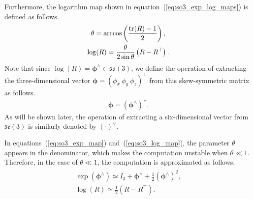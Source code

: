 Furthermore, the logarithm map shown in equation~(\ref{eq:so3_exp_log_maps}) is defined as follows.
%
\begin{align}
  \begin{gathered}
    \theta = \arccos \left( \frac{{\rm tr}(R) - 1}{ 2 } \right), \\
    \log( R ) = \frac{ \theta }{ 2 \sin \theta } \left( R - R^{\top} \right).
  \end{gathered}
  \label{eq:so3_log_map}
\end{align}
%
Note that since $\log(R) = \boldsymbol{\phi}^{\wedge} \in \mathfrak{so}(3)$, we define the operation of extracting the three-dimensional vector $\boldsymbol{\phi} = \left( \phi_{x} ~ \phi_{y} ~ \phi_{z} \right)^{\top}$ from this skew-symmetric matrix as follows.
%
\begin{align}
  \boldsymbol \phi = \left( \boldsymbol \phi^{\wedge} \right)^{\vee}.
\end{align}
%
As will be shown later, the operation of extracting a six-dimensional vector from $\mathfrak{se}(3)$ is similarly denoted by $\left( \cdot \right)^{\vee}$.

In equations~(\ref{eq:so3_exp_map}) and~(\ref{eq:so3_log_map}), the parameter $\theta$ appears in the denominator, which makes the computation unstable when $\theta \ll 1$.
Therefore, in the case of $\theta \ll 1$, the computation is approximated as follows.
%
\begin{align}
  \begin{gathered}
    \exp \left( \boldsymbol \phi^{\wedge} \right) \simeq I_{3} + \boldsymbol \phi^{\wedge} + \frac{1}{2} \left( \boldsymbol \phi^{\wedge} \right)^{2}, \\
%
    \log \left( R \right) \simeq \frac{1}{2} \left( R - R^{\top} \right).
  \end{gathered}
  \label{eq:so3_exp_log_maps_approx}
\end{align}
%

